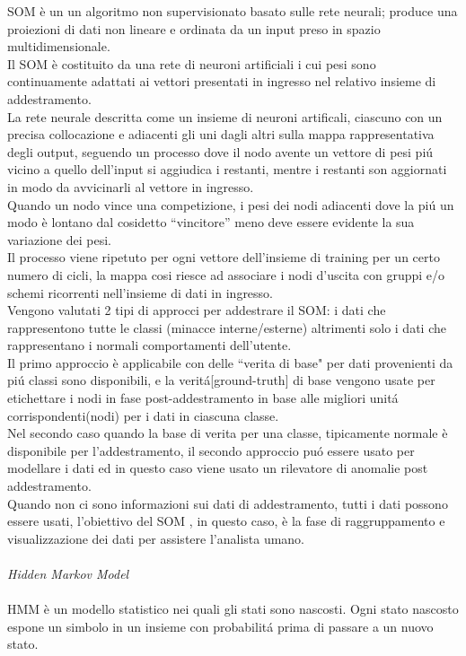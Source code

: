\documentclass[../tesi.tex]{subfiles}
\begin{document}
SOM è un un algoritmo non supervisionato basato sulle rete neurali; produce una proiezioni di dati non lineare e ordinata da un input preso in spazio multidimensionale.\\
Il SOM è costituito da una rete di neuroni artificiali i cui pesi sono continuamente adattati ai vettori presentati in ingresso nel relativo insieme di addestramento.\\
La rete neurale descritta come un insieme di neuroni artificali, ciascuno con un precisa collocazione e adiacenti gli uni dagli altri sulla mappa rappresentativa degli output, seguendo un processo dove il nodo avente un vettore di pesi piú vicino a quello dell’input si aggiudica i restanti, mentre i restanti son aggiornati in modo da avvicinarli al vettore in ingresso.\\
Quando un nodo vince una competizione, i pesi dei nodi adiacenti dove la piú un modo è lontano dal cosidetto “vincitore” meno deve essere evidente la sua variazione dei pesi.\\
Il processo viene ripetuto per ogni vettore dell’insieme di training per un certo numero di cicli, la mappa cosi riesce ad associare i nodi d’uscita con gruppi e/o schemi ricorrenti nell’insieme di dati in ingresso.\\
Vengono valutati 2 tipi di approcci per addestrare il SOM: i dati che rappresentono tutte le classi (minacce interne/esterne) altrimenti solo i dati che rappresentano i normali comportamenti dell’utente.\\
Il primo approccio è applicabile con delle ``verita di base" per dati provenienti da piú classi sono disponibili, e la veritá[ground-truth] di base vengono usate per etichettare i nodi in fase post-addestramento in base alle migliori unitá corrispondenti(nodi) per i dati in ciascuna classe.\\
Nel secondo caso quando la base di verita per una classe, tipicamente normale è disponibile per l’addestramento, il secondo approccio puó essere usato per modellare i dati ed in questo caso viene usato un rilevatore di anomalie post addestramento.\\
Quando non ci sono informazioni sui dati di addestramento, tutti i dati possono essere usati, l’obiettivo del SOM , in questo caso, è la fase di raggruppamento e visualizzazione dei dati per assistere l’analista umano.\\
\\
\textit{Hidden Markov Model}\\
\\ 
HMM è un modello statistico nei quali gli stati sono nascosti. Ogni stato nascosto espone un simbolo in un insieme con probabilitá prima di passare a un nuovo stato.\\
\end{document}
